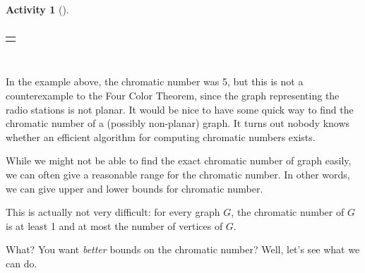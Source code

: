\documentclass[10pt,]{book}
\theoremstyle{plain}
\theoremstyle{definition}
\theoremstyle{definition}
\theoremstyle{definition}
\newtheorem{activity}[project]{Activity}
\numberwithin{equation}{chapter}
\newlength{\panelmax}
\begin{document}
\begin{activity}[]
{\begin{lrbox}{\panelboxAimage}
{{\begin{tabular}{c|c|c|c|c|c|c|c|c|c|c|}
\end{tabular}
}
}\end{lrbox}
\ifdefined\phAimage\else\newlength{\phAimage}\fi%
\setlength{\phAimage}{\ht\panelboxAimage+\dp\panelboxAimage}
\settototalheight{\phAimage}{\usebox{\panelboxAimage}}
\setlength{\panelmax}{\maxof{\panelmax}{\phAimage}}
\leavevmode%
\setlength{\tabcolsep}{0\linewidth}
\par\medskip\noindent
\begin{tabular}{@{}*{1}{c}@{}}
\begin{minipage}[c][\panelmax][t]{1\linewidth}\usebox{\panelboxAimage}\end{minipage}\end{tabular}\\
}%
\end{activity}
\hypertarget{p-368}{}%
In the example above, the chromatic number was 5, but this is not a counterexample to the Four Color Theorem, since the graph representing the radio stations is not planar. It would be nice to have some quick way to find the chromatic number of a (possibly non-planar) graph. It turns out nobody knows whether an efficient algorithm for computing chromatic numbers exists.%
\par
\hypertarget{p-369}{}%
While we might not be able to find the exact chromatic number of graph easily, we can often give a reasonable range for the chromatic number. In other words, we can give upper and lower bounds for chromatic number.%
\par
\hypertarget{p-370}{}%
This is actually not very difficult: for every graph \(G\), the chromatic number of \(G\) is at least 1 and at most the number of vertices of \(G\).%
\par
\hypertarget{p-371}{}%
What? You want \emph{better} bounds on the chromatic number? Well, let's see what we can do.%
\end{document}

